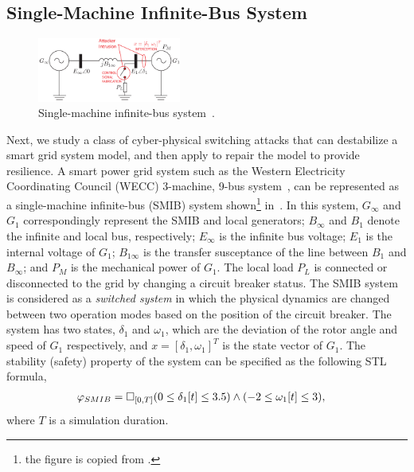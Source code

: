 \subsection{Single-Machine Infinite-Bus System}
%
\begin{figure}[t!]%
	\centering%
    \includegraphics[width=0.42\textwidth]{image/smib}%
	\caption{Single-machine infinite-bus system~\cite{farraj2014practical}.}%
	\vspace{-1em}
\end{figure}%
Next, we study a class of cyber-physical switching attacks that can destabilize a smart grid system model, and then apply \toolreaffirm to repair the model to provide resilience. A smart power grid system such as the Western Electricity Coordinating Council (WECC) 3-machine, 9-bus system~\cite{sauer1998power}, can be represented as a single-machine infinite-bus (SMIB) system shown\footnote{the figure is copied from \cite{farraj2014practical}.} in~. In this system, $G_\infty$ and $G_1$ correspondingly represent the SMIB and local generators; $B_\infty$ and $B_1$ denote the infinite and local bus, respectively; $E_\infty$ is the infinite bus voltage; $E_1$ is the internal voltage of $G_1$; $B_{1\infty}$ is the transfer susceptance of the line between $B_1$ and $B_\infty$; and $P_M$ is the mechanical power of $G_1$. The local load $P_L$ is connected or disconnected to the grid by changing a circuit breaker status. The SMIB system is considered as a \emph{switched system} in which the physical dynamics are changed between two operation modes based on the position of the circuit breaker. The system has two states, $\delta_1$ and $\omega_1$, which are the deviation of the rotor angle and speed of $G_1$ respectively, and $x = [\delta_1,\omega_1]^T$ is the state vector of $G_1$.
%
The stability (safety) property of the system can be specified as the following STL formula,
%
\begin{align} 
\vspace{-1em}
	\varphi_{SMIB} & = \Box_{[0, T]} (0 \leq \delta_1[t] \leq 3.5) \wedge (-2 \leq \omega_1[t] \leq 3),\formlabel{smib_stl}
		\vspace{-1em}
\end{align} 
where $T$ is a simulation duration.  

